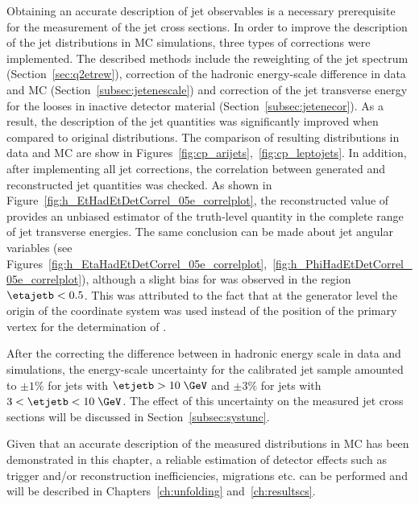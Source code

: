 %
Obtaining an accurate description of jet observables is a necessary prerequisite for the measurement of the jet cross sections. In order to improve the description of the jet distributions in MC simulations, three types of corrections were implemented. The described methods include the reweighting of the jet spectrum (Section~\ref{sec:q2etrew}), correction of the hadronic energy-scale difference in data and MC (Section~\ref{subsec:jetenescale}) and correction of the jet transverse energy for the looses in inactive detector material (Section~\ref{subsec:jetenecor}). As a result, the description of the jet quantities was significantly improved when compared to original distributions. The comparison of resulting distributions in data and MC are show in Figures~\ref{fig:cp_arijets},~\ref{fig:cp_leptojets}. In addition, after implementing all jet corrections, the correlation between generated and reconstructed jet quantities was checked. As shown in Figure~\ref{fig:h_EtHadEtDetCorrel_05e_correlplot}, the reconstructed value of \etjetb provides an unbiased estimator of the truth-level quantity in the complete range of jet transverse energies. The same conclusion can be made about jet angular variables (see Figures~\ref{fig:h_EtaHadEtDetCorrel_05e_correlplot},~\ref{fig:h_PhiHadEtDetCorrel_05e_correlplot}), although a slight bias for \etajetb was observed in the region $\etajetb < 0.5$. This was attributed to the fact that at the generator level the origin of the \zeus coordinate system was used instead of the position of the primary vertex for the determination of \etajetb.

After the correcting the difference between in hadronic energy scale in data and simulations, the energy-scale uncertainty for the calibrated jet sample amounted to $\pm 1\%$ for jets with $\etjetb > 10\;\GeV$  and $\pm 3\%$ for jets with $3 < \etjetb < 10\;\GeV$. The effect of this uncertainty on the measured jet cross sections will be discussed in Section~\ref{subsec:systunc}.

Given that an accurate description of the measured distributions in MC has been demonstrated in this chapter, a reliable estimation of detector effects such as trigger and/or reconstruction inefficiencies, migrations etc. can be performed and will be described in Chapters~\ref{ch:unfolding} and~\ref{ch:resultscs}.